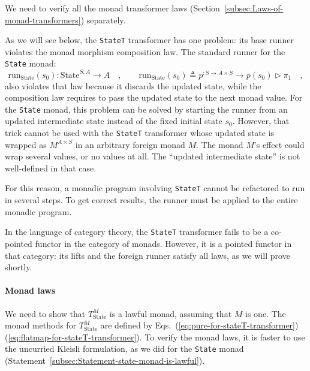 We need to verify all the monad transformer laws (Section~\ref{subsec:Laws-of-monad-transformers})
separately.

As we will see below, the \lstinline!StateT! transformer has one
problem: its base runner violates the monad morphism composition law.
The standard runner for the \lstinline!State! monad:
\[
\text{run}_{\text{State}}(s_{0}):\text{State}^{S,A}\rightarrow A\quad,\quad\quad\text{run}_{\text{State}}(s_{0})\triangleq p^{:S\rightarrow A\times S}\rightarrow p(s_{0})\triangleright\pi_{1}\quad,
\]
also violates that law because it discards the updated state, while
the composition law requires to pass the updated state to the next
monad value. For the \lstinline!State! monad, this problem can be
solved by starting the runner from an updated intermediate state instead
of the fixed initial state $s_{0}$. However, that trick cannot be
used with the \lstinline!StateT! transformer whose updated state
is wrapped as $M^{A\times S}$ in an arbitrary foreign monad $M$.
The monad $M$\textsf{'}s effect could wrap several values, or no values at
all. The \textsf{``}updated intermediate state\textsf{''} is not well-defined in that
case.

For this reason, a monadic program involving \lstinline!StateT! cannot
be refactored to run in several steps. To get correct results, the
runner must be applied to the entire monadic program.

In the language of category theory, the \lstinline!StateT! transformer
fails to be a co-pointed functor in the category of monads. However,
it is a pointed functor in that category: its lifts and the foreign
runner satisfy all laws, as we will prove shortly.

\paragraph{Monad laws}

We need to show that $T_{\text{State}}^{M}$ is a lawful monad, assuming
that $M$ is one. The monad methods for $T_{\text{State}}^{M}$ are
defined by Eqs.~(\ref{eq:pure-for-stateT-transformer})\textendash (\ref{eq:flatmap-for-stateT-transformer}).
To verify the monad laws, it is faster to use the uncurried Kleisli
formulation, as we did for the \lstinline!State! monad (Statement~\ref{subsec:Statement-state-monad-is-lawful}). 

